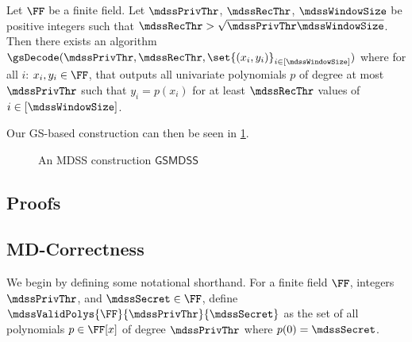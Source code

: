 \begin{theorem}
	\label{thm:GS}
	Let $\FF$ be a finite field.
	Let $\mdssPrivThr$, $\mdssRecThr$, $\mdssWindowSize$ be positive integers such that $\mdssRecThr > \sqrt{\mdssPrivThr\mdssWindowSize}$.
	Then there exists an algorithm $\gsDecode(\mdssPrivThr, \mdssRecThr, \set{(x_i, y_i)}_{i\in[\mdssWindowSize]})$ where for all $i$: $x_i, y_i \in \FF$, that outputs all univariate polynomials $p$ of degree at most $\mdssPrivThr$ such that $y_i = p(x_i)$ for at least $\mdssRecThr$ values of $i \in [\mdssWindowSize]$.
\end{theorem}

Our GS-based construction can then be seen in \cref{fig:gs-mdss}.
\begin{figure}
	\begin{pcvstack}[boxed, center, space=1em]

	\end{pcvstack}
	\caption{An MDSS construction $\mathsf{GSMDSS}$}
	\label{fig:gs-mdss}
\end{figure}

\subsection{Proofs}

\subsection{MD-Correctness}

We begin by defining some notational shorthand.
For a finite field $\FF$, integers $\mdssPrivThr$, and $\mdssSecret \in \FF$, define $\mdssValidPolys{\FF}{\mdssPrivThr}{\mdssSecret}$ as the set of all polynomials $p \in \FF[x]$ of degree $\mdssPrivThr$ where $p(0) = \mdssSecret$.

